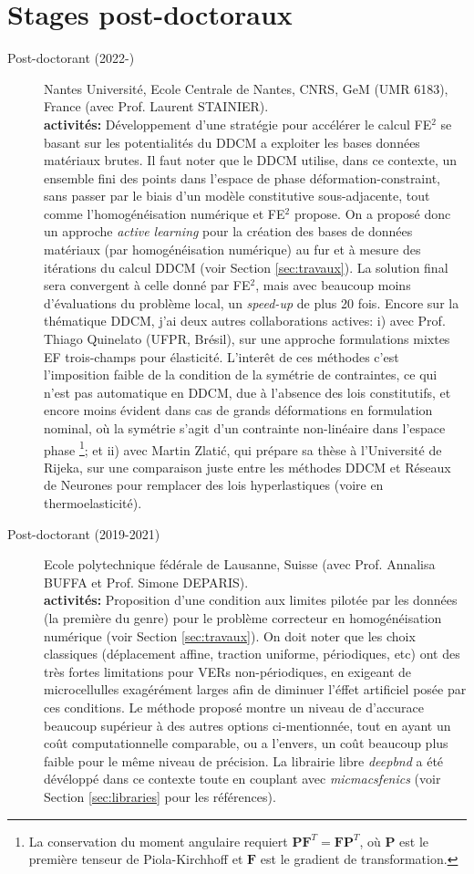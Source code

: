 \documentclass[french]{article}
\begin{document}
\section*{Stages post-doctoraux}
\begin{description}
\item[Post-doctorant (2022-)]  Nantes Université, Ecole Centrale de Nantes, CNRS, GeM (UMR 6183), France (avec Prof. Laurent STAINIER). \\
\textbf{activités:} Développement d'une stratégie pour accélérer le calcul FE$^2$ se basant sur les potentialités du DDCM a exploiter les bases données matériaux brutes. Il faut noter que le DDCM utilise, dans ce contexte, un ensemble fini des points dans l'espace de phase déformation-constraint, sans passer par le biais d'un modèle constitutive sous-adjacente, tout comme l'homogénéisation numérique et FE$^2$ propose. On a proposé donc un approche  \textit{active learning} pour la création des bases de données matériaux (par homogénéisation numérique) au fur et à mesure des itérations du calcul DDCM (voir Section \ref{sec:travaux}). La solution final sera convergent à celle donné par FE$^2$, mais avec beaucoup moins d'évaluations du problème local, un \textit{speed-up} de plus 20 fois. 
Encore sur la thématique DDCM, j'ai deux autres collaborations actives: i) avec Prof. Thiago Quinelato (UFPR, Brésil), sur une approche formulations mixtes EF trois-champs pour élasticité. L'interêt de ces méthodes c'est l'imposition faible de la condition de la symétrie de contraintes, ce qui n'est pas automatique en DDCM, due à l'absence des lois constitutifs, et encore moins évident dans cas de grands déformations en formulation nominal, où la symétrie s'agit d'un contrainte non-linéaire dans l'espace phase \footnote{La conservation du moment angulaire requiert $\mathbf{P} \mathbf{F}^T = \mathbf{F} \mathbf{P}^T$, où $\mathbf{P}$ est le première tenseur de Piola-Kirchhoff et $\mathbf{F}$ est le gradient de transformation.}; et ii) avec Martin Zlatić, qui prépare sa thèse à l'Université de Rijeka, sur une comparaison juste entre les méthodes DDCM et Réseaux de Neurones pour remplacer des lois hyperlastiques (voire en thermoelasticité).
\item[Post-doctorant (2019-2021)] Ecole polytechnique fédérale de Lausanne, Suisse (avec Prof. Annalisa BUFFA et Prof. Simone DEPARIS). \\
\textbf{activités:}
Proposition d'une condition aux limites pilotée par les données (la première du genre) pour le problème correcteur en homogénéisation numérique (voir Section \ref{sec:travaux}). On doit noter que les choix classiques (déplacement affine, traction uniforme, périodiques, etc) ont des très fortes limitations pour VERs non-périodiques, en exigeant de microcellulles exagérément larges afin de diminuer l'éffet artificiel posée par ces conditions. Le méthode proposé montre un niveau de d'accurace beaucoup supérieur à des autres options ci-mentionnée, tout en ayant un coût computationnelle comparable, ou a l'envers, un coût beaucoup plus faible pour le même niveau de précision. La librairie libre \textit{deepbnd} a été dévéloppé dans ce contexte toute en couplant avec \textit{micmacsfenics} (voir Section \ref{sec:libraries} pour les références).

\end{description}
\end{document}
